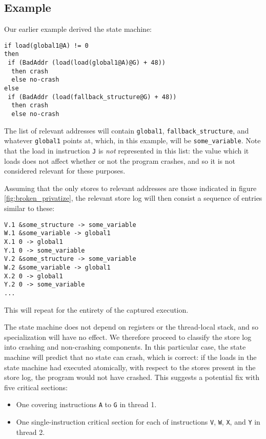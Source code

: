 \documentclass[10pt,twocolumn,preprint,natbib,authoryear]{sigplanconf}
\begin{document}
\subsection{Example}

Our earlier example derived the state machine:

\begin{verbatim}
if load(global1@A) != 0
then
 if (BadAddr (load(load(global1@A)@G) + 48))
  then crash
  else no-crash
else
 if (BadAddr (load(fallback_structure@G) + 48))
  then crash
  else no-crash
\end{verbatim}

The list of relevant addresses will contain \verb|global1|,
\verb|fallback_structure|, and whatever \verb|global1| points at,
which, in this example, will be \verb|some_variable|.  Note that the
load in instruction \verb|J| is \emph{not} represented in this list:
the value which it loads does not affect whether or not the program
crashes, and so it is not considered relevant for these purposes.

Assuming that the only stores to relevant addresses are those
indicated in figure \ref{fig:broken_privatize}, the relevant store log
will then consist a sequence of entries similar to these:

\begin{verbatim}
V.1 &some_structure -> some_variable
W.1 &some_variable -> global1
X.1 0 -> global1
Y.1 0 -> some_variable
V.2 &some_structure -> some_variable
W.2 &some_variable -> global1
X.2 0 -> global1
Y.2 0 -> some_variable
...
\end{verbatim}

This will repeat for the entirety of the captured execution.

The state machine does not depend on registers or the thread-local
stack, and so specialization will have no effect.  We therefore
proceed to classify the store log into crashing and non-crashing
components.  In this particular case, the state machine will predict
that no state can crash, which is correct: if the loads in the state
machine had executed atomically, with respect to the stores present in
the store log, the program would not have crashed.  This suggests a
potential fix with five critical sections:

\begin{itemize}
\item One covering instructions \verb|A| to \verb|G| in thread 1.
\item One single-instruction critical section for each of instructions
  \verb|V|, \verb|W|, \verb|X|, and \verb|Y| in thread 2.
\end{itemize}
\end{document}
